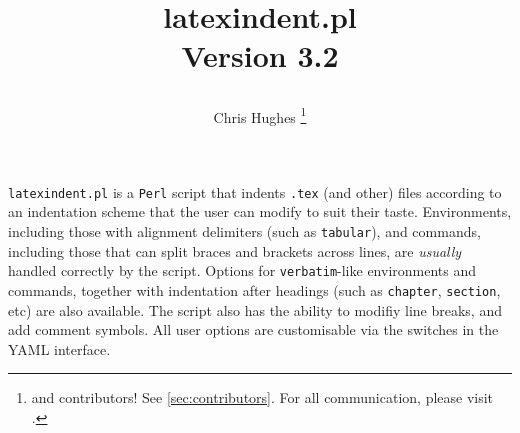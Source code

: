 \documentclass[10pt]{article}
\begin{document}
\renewcommand*{\thefootnote}{\arabic{footnote}}
\title{%
	\begin{tcolorbox}[
			width=5.2cm,
			boxrule=0pt,
			colframe=white!40!black,
			colback=white,
			rightrule=2pt,
			sharp corners,
			enhanced,
			overlay={\node[anchor=north east,outer sep=2pt] at ([xshift=3cm,yshift=4mm]frame.north east) {\texttt{[image: logo]}}; }]
		\centering\ttfamily\bfseries latexindent.pl\\[1cm] Version 3.2
	\end{tcolorbox}
}
\author{Chris Hughes \thanks{and contributors! See \vref{sec:contributors}. For
		all communication, please visit \cite{latexindent-home}.}}
\maketitle
\begin{adjustwidth}{1cm}{1cm}
	\small
	\texttt{latexindent.pl} is a \texttt{Perl} script that indents \texttt{.tex} (and other)
	files according to an indentation scheme that the user can modify to suit their
	taste. Environments, including those with alignment delimiters (such as \texttt{tabular}),
	and commands, including those that can split braces and brackets across lines,
	are \emph{usually} handled correctly by the script. Options for \texttt{verbatim}-like
	environments and commands, together with indentation after headings (such as \lstinline!chapter!, \lstinline!section!, etc)
	are also available. The script also has the ability to modifiy line breaks, and add
	comment symbols. All user options are customisable via the switches in the YAML interface.
\end{adjustwidth}
\tableofcontents
{\small
	\lstlistoflistings
}














\stopcontents[noAdditionalIndent]







\end{document}
